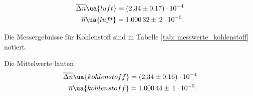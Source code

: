 \begin{align}
  \label{eq:mittelwerte_luft}
  \begin{aligned}
    \overline{\Delta n}\ua{luft}=\num{2.34\pm 0.17 e-4}\\
    \overline{n}\ua{luft}=\num{1.00032}\pm\, \num{2e-5}.
  \end{aligned}
\end{align}

Die Messergebnisse für Kohlenstoff sind in Tabelle \ref{tab: messwerte_kohlenstoff} notiert.



Die Mittelwerte lauten %
\begin{align}
  \label{eq:mittelwerte_kohlenstoff}
  \begin{aligned}
    \overline{\Delta n}\ua{kohlenstoff}=\num{2.34\pm 0.16 e-4}\\
    \overline{n}\ua{kohlenstoff}=\num{1.00044} \pm\,\num{1e-5}.
  \end{aligned}
\end{align}
